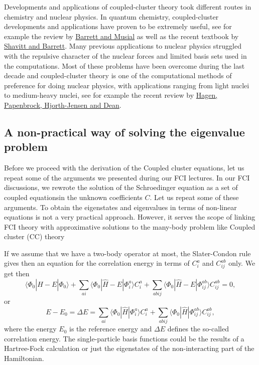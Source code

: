 \documentclass[%
oneside,                 %
final,                   %
10pt]{article}
\begin{document}
Developments and applications
of coupled-cluster theory took different routes in chemistry
and nuclear physics. In quantum chemistry,
coupled-cluster developments
and applications have proven to be extremely useful, see for example the review by \href{{http://journals.aps.org/rmp/abstract/10.1103/RevModPhys.79.291}}{Barrett and Musial} as well as the recent 
textbook by \href{{http://www.cambridge.org/fr/academic/subjects/chemistry/physical-chemistry/many-body-methods-chemistry-and-physics-mbpt-and-coupled-cluster-theory?format=HB}}{Shavitt and Barrett}.  Many previous applications to nuclear physics struggled with the repulsive character of the nuclear forces and limited basis sets used in the computations. Most of these problems have been overcome during the last decade and coupled-cluster
theory is one of the computational methods of preference for doing nuclear physics, with applications ranging from light nuclei to medium-heavy nuclei,
see for example the recent review by \href{{http://iopscience.iop.org/0034-4885/77/9/096302}}{Hagen, Papenbrock, Hjorth-Jensen and Dean}. 


\subsection*{A non-practical way of solving the eigenvalue problem}

Before we proceed with the derivation of the Coupled cluster equations, let us repeat some of the arguments we presented during our FCI lectures. 
In our FCI discussions, we rewrote the solution of the Schroedinger equation as a set of coupled equationsin the unknown coefficients $C$. Let us repeat some of these arguments.
To obtain the eigenstates and eigenvalues in terms of non-linear equations is not a very practical approach. However, it serves the scope of linking FCI theory with approximative solutions to the many-body problem
like Coupled cluster (CC) theory 

If we assume that we have a two-body operator at most, the Slater-Condon rule 
gives then an equation for the 
correlation energy in terms of $C_i^a$ and $C_{ij}^{ab}$ only.  We get then
\[
\langle \Phi_0 | \hat{H} -E| \Phi_0\rangle + \sum_{ai}\langle \Phi_0 | \hat{H} -E|\Phi_{i}^{a} \rangle C_{i}^{a}+
\sum_{abij}\langle \Phi_0 | \hat{H} -E|\Phi_{ij}^{ab} \rangle C_{ij}^{ab}=0,
\]
or 
\[
E-E_0 =\Delta E=\sum_{ai}\langle \Phi_0 | \hat{H}|\Phi_{i}^{a} \rangle C_{i}^{a}+
\sum_{abij}\langle \Phi_0 | \hat{H}|\Phi_{ij}^{ab} \rangle C_{ij}^{ab},
\]
where the energy $E_0$ is the reference energy and $\Delta E$ defines the so-called correlation energy.
The single-particle basis functions  could be the results of a Hartree-Fock calculation or just the eigenstates of the non-interacting part of the Hamiltonian. 
\end{document}
